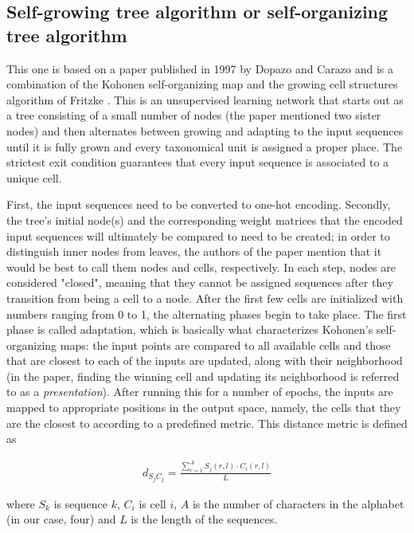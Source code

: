 \documentclass[11pt,twocolumn]{article}
\begin{document}
\subsection*{Self-growing tree algorithm or self-organizing tree algorithm}

This one is based on a paper published in 1997 by Dopazo and Carazo \cite{Dopazo1997} and is a combination of the Kohonen self-organizing map \cite{58325} and the growing cell structures algorithm of Fritzke \cite{Fritzke1994}. This is an unsupervised learning network that starts out as a tree consisting of a small number of nodes (the paper mentioned two sister nodes) and then alternates between growing and adapting to the input sequences until it is fully grown and every taxonomical unit is assigned a proper place. The strictest exit condition guarantees that every input sequence is associated to a unique cell.

First, the input sequences need to be converted to one-hot encoding. Secondly, the tree's initial node(s) and the corresponding weight matrices that the encoded input sequences will ultimately be compared to need to be created; in order to distinguish inner nodes from leaves, the authors of the paper mention that it would be best to call them nodes and cells, respectively. In each step, nodes are considered "closed", meaning that they cannot be assigned sequences after they transition from being a cell to a node. After the first few cells are initialized with numbers ranging from 0 to 1, the alternating phases begin to take place. The first phase is called adaptation, which is basically what characterizes Kohonen's self-organizing maps: the input points are compared to all available cells and those that are closest to each of the inputs are updated, along with their neighborhood (in the paper, finding the winning cell and updating its neighborhood is referred to as a \textit{presentation}). After running this for a number of epochs, the inputs are mapped to appropriate positions in the output space, namely, the cells that they are the closest to according to a predefined metric. This distance metric is defined as

\begin{align}
d_{S_j C_j} = \frac{\sum_{r = 1}^A S_j(r, l) \cdot C_i(r, l)}{L}
\end{align}

where $S_k$ is sequence $k$, $C_i$ is cell $i$, $A$ is the number of characters in the alphabet (in our case, four) and $L$ is the length of the sequences.
\end{document}
